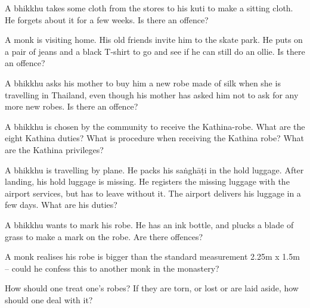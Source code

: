 \bigskip

A bhikkhu takes some cloth from the stores to his kuti to make a sitting cloth. He
forgets about it for a few weeks. Is there an offence?

\bigskip

A monk is visiting home. His old friends invite him to the skate park. He puts
on a pair of jeans and a black T-shirt to go and see if he can still do an
ollie. Is there an offence?

\bigskip

A bhikkhu asks his mother to buy him a new robe made of silk when she is travelling in Thailand,
even though his mother has asked him not to ask for any more new robes. Is there an offence?

\bigskip

A bhikkhu is chosen by the community to receive the Kathina-robe. What are the
eight Kathina duties? What is procedure when receiving the Kathina robe? What
are the Kathina privileges?

\bigskip

A bhikkhu is travelling by plane. He packs his saṅghāṭi in the hold luggage. After
landing, his hold luggage is missing. He registers the missing luggage with the
airport services, but has to leave without it. The airport delivers his luggage
in a few days. What are his duties?

\bigskip

A bhikkhu wants to mark his robe. He has an ink bottle, and plucks a blade of
grass to make a mark on the robe. Are there offences?

\bigskip

A monk realises his robe is bigger than the standard measurement 2.25m x 1.5m –
could he confess this to another monk in the monastery?

\bigskip

How should one treat one's robes? If they are torn, or lost or are laid aside, how should one deal with it?
